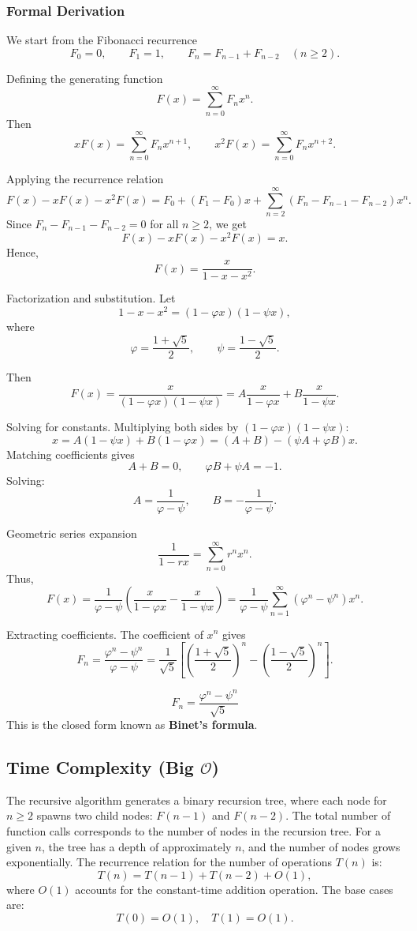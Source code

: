 \documentclass{article}
\begin{document}
\subsubsection{Formal Derivation}

We start from the Fibonacci recurrence
\[
F_0 = 0, \qquad F_1 = 1, \qquad F_n = F_{n-1} + F_{n-2} \quad (n \ge 2).
\]

Defining the generating function
\[
F(x) = \sum_{n=0}^{\infty} F_n x^n.
\]
Then
\[
xF(x) = \sum_{n=0}^{\infty} F_n x^{n+1}, \qquad
x^2F(x) = \sum_{n=0}^{\infty} F_n x^{n+2}.
\]

Applying the recurrence relation
\[
F(x) - xF(x) - x^2F(x)
= F_0 + (F_1 - F_0)x + \sum_{n=2}^{\infty}(F_n - F_{n-1} - F_{n-2})x^n.
\]
Since $F_n - F_{n-1} - F_{n-2} = 0$ for all $n \ge 2$, we get
\[
F(x) - xF(x) - x^2F(x) = x.
\]
Hence,
\[
F(x) = \frac{x}{1 - x - x^2}.
\]

Factorization and substitution.
Let
\[
1 - x - x^2 = (1 - \varphi x)(1 - \psi x),
\]
where
\[
\varphi = \frac{1+\sqrt{5}}{2}, \qquad
\psi = \frac{1-\sqrt{5}}{2}.
\]

Then
\[
F(x) = \frac{x}{(1 - \varphi x)(1 - \psi x)}
= A\frac{x}{1 - \varphi x} + B\frac{x}{1 - \psi x}.
\]

Solving for constants.
Multiplying both sides by $(1 - \varphi x)(1 - \psi x)$:
\[
x = A(1 - \psi x) + B(1 - \varphi x)
= (A + B) - (\psi A + \varphi B)x.
\]
Matching coefficients gives
\[
A + B = 0, \qquad \varphi B + \psi A = -1.
\]
Solving:
\[
A = \frac{1}{\varphi - \psi}, \qquad B = -\frac{1}{\varphi - \psi}.
\]

Geometric series expansion
\[
\frac{1}{1 - r x} = \sum_{n=0}^{\infty} r^n x^n.
\]
Thus,
\[
F(x)
= \frac{1}{\varphi - \psi}
\left(
\frac{x}{1 - \varphi x} - \frac{x}{1 - \psi x}
\right)
= \frac{1}{\varphi - \psi}
\sum_{n=1}^{\infty} (\varphi^n - \psi^n)x^n.
\]

Extracting coefficients.
The coefficient of $x^n$ gives
\[
F_n = \frac{\varphi^n - \psi^n}{\varphi - \psi}
= \frac{1}{\sqrt{5}}
\left[
\left(\frac{1+\sqrt{5}}{2}\right)^n
- \left(\frac{1-\sqrt{5}}{2}\right)^n
\right].
\]

\[
\boxed{
	F_n = \frac{\varphi^n - \psi^n}{\sqrt{5}}
}
\]
This is the closed form known as \textbf{Binet's formula}.


\subsection{Time Complexity (Big $\mathcal{O}$)}
The recursive algorithm generates a binary recursion tree, where each node for \( n \geq 2 \) spawns two child nodes: \( F(n-1) \) and \( F(n-2) \).
The total number of function calls corresponds to the number of nodes in the recursion tree. For a given \( n \), the tree has a depth of approximately \( n \), and the number of nodes grows exponentially. The recurrence relation for the number of operations \( T(n) \) is:
\[
T(n) = T(n-1) + T(n-2) + O(1),
\]
where \( O(1) \) accounts for the constant-time addition operation. The base cases are:
\[
T(0) = O(1), \quad T(1) = O(1).
\]
\end{document}
